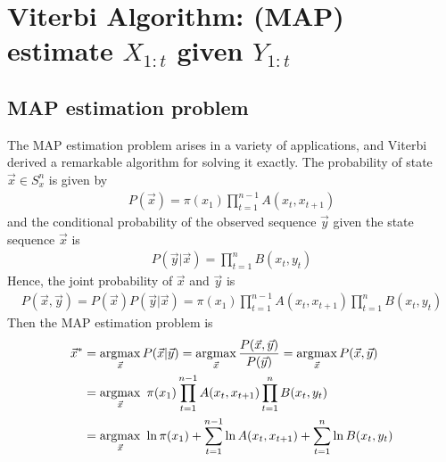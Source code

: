 \documentclass[11pt]{elegantbook}
\newcommand{\argmax}{\operatornamewithlimits{argmax}}
\begin{document}
\section{Viterbi Algorithm: (MAP) estimate $X_{1:t}$ given $Y_{1:t}$}
\subsection{MAP estimation problem}
The MAP estimation problem arises in a variety of applications, and Viterbi derived a remarkable algorithm for solving it exactly. The probability of state $\vec{x}\in S_x^n$ is given by
\begin{equation}
    \begin{aligned}
        P(\vec{x})=\pi(x_1)\prod_{t=1}^{n-1}A(x_t,x_{t+1})
    \end{aligned}
    \nonumber
\end{equation}
and the conditional probability of the observed sequence $\vec{y}$ given the state sequence $\vec{x}$ is
\begin{equation}
    \begin{aligned}
        P(\vec{y}|\vec{x})=\prod_{t=1}^n B(x_t,y_t)
    \end{aligned}
    \nonumber
\end{equation}
Hence, the joint probability of $\vec{x}$ and $\vec{y}$ is
\begin{equation}
    \begin{aligned}
        P(\vec{x},\vec{y})=P(\vec{x})P(\vec{y}|\vec{x})=\pi(x_1)\prod_{t=1}^{n-1}A(x_t,x_{t+1})\prod_{t=1}^n B(x_t,y_t)
    \end{aligned}
    \nonumber
\end{equation}
Then the MAP estimation problem is
\begin{equation}
    \begin{aligned}
        \vec{x}^*&=\argmax_{\vec{x}}P(\vec{x}|\vec{y})=\argmax_{\vec{x}}\frac{P(\vec{x},\vec{y})}{P(\vec{y})}=\argmax_{\vec{x}}P(\vec{x},\vec{y})\\
        &=\argmax_{\vec{x}}\ \pi(x_1)\prod_{t=1}^{n-1}A(x_t,x_{t+1})\prod_{t=1}^n B(x_t,y_t)\\
        &=\argmax_{\vec{x}}\ \ln\pi(x_1)+\sum_{t=1}^{n-1}\ln A(x_t,x_{t+1})+\sum_{t=1}^n\ln B(x_t,y_t)
    \end{aligned}
    \nonumber
\end{equation}
\end{document}
